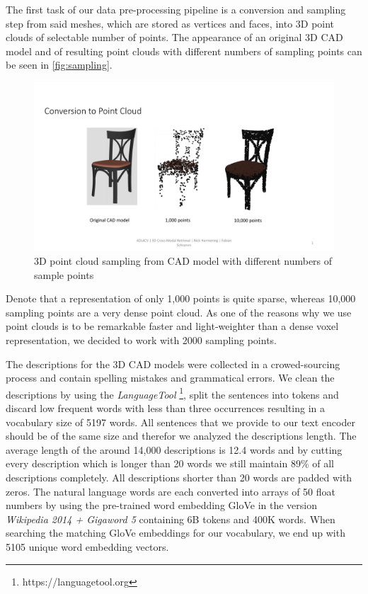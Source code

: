 \documentclass[10pt,twocolumn,letterpaper]{article}
\begin{document}
The first task of our data pre-processing pipeline is a conversion and sampling step from said meshes, which are stored as vertices and faces, into 3D point clouds of selectable number of points. The appearance of an original 3D CAD model and of resulting point clouds with different numbers of sampling points can be seen in \autoref{fig:sampling}.
\begin{figure}[t]%
	\centering
	\includegraphics[width=0.8\linewidth]{fig2.pdf}
	\caption[]{3D point cloud sampling from CAD model with different numbers of sample points}
	\label{fig:sampling}
\end{figure}
Denote that a representation of only 1,000 points is quite sparse, whereas 10,000 sampling points are a very dense point cloud. As one of the reasons why we use point clouds is to be remarkable faster and light-weighter than a dense voxel representation, we decided to work with 2000 sampling points. 

The descriptions for the 3D CAD models were collected in a crowed-sourcing process and contain spelling mistakes and grammatical errors. We clean the descriptions by using the \textit{LanguageTool} \footnote{https://languagetool.org}, split the sentences into tokens and discard low frequent words with less than three occurrences resulting in a vocabulary size of 5197 words. All sentences that we provide to our text encoder should be of the same size and therefor we analyzed the descriptions length. The average length of the around 14,000 descriptions is 12.4 words and by cutting every description which is longer than 20 words we still maintain 89\% of all descriptions completely. All descriptions shorter than 20 words are padded with zeros. The natural language words are each converted into arrays of 50 float numbers by using the pre-trained word embedding GloVe \cite{pennington2014glove} in the version \textit{Wikipedia 2014 + Gigaword 5} containing 6B tokens and 400K words. When searching the matching GloVe embeddings for our vocabulary, we end up with 5105 unique word embedding vectors.
\end{document}
